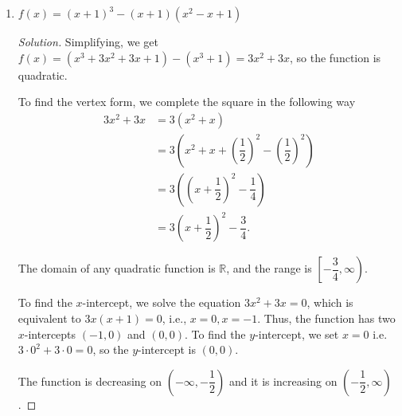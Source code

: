 \documentclass[12pt]{article}
\newenvironment{solution}{\begin{proof}[Solution]}{\end{proof}}
\begin{document}
\begin{enumerate}
\begin{enumerate}
\begin{solution}
				The function has a maximum at the point $\left(0,-\dfrac{9}{4}\right)$ and has no minimum.
				
			\end{solution}
			\item $f(x)=(x+1)^3-(x+1)(x^2-x+1)$
	
			\begin{solution}
				Simplifying, we get $f(x)=(x^3+3x^2+3x+1)-(x^3+1)=3x^2+3x$, so the function is quadratic.
				
				To find the vertex form, we complete the square in the following way
				\begin{align*}
					3x^2+3x&=3(x^2+x)\\
					&=3(x^2+x+\left(\dfrac{1}{2}\right)^2-\left(\dfrac{1}{2}\right)^2)\\
					&=3(\left(x+\dfrac{1}{2}\right)^2-\dfrac{1}{4})\\
					&=3\left(x+\dfrac{1}{2}\right)^2-\dfrac{3}{4}.
				\end{align*}
				
				The domain of any quadratic function is $\mathbb{R}$, and the range is $\left[-\dfrac{3}{4},\infty \right).$
				
				To find the $x$-intercept, we solve the equation $3x^2+3x=0$, which is equivalent to $3x(x+1)=0$, i.e., $x=0, x=-1$. Thus, the function has two $x$-intercepts $(-1,0)$ and $(0,0)$. To find the $y$-intercept, we set $x=0$ i.e. $3\cdot0^2+3\cdot 0=0$, so the $y$-intercept is $(0,0)$.
				
				The function is decreasing on $(-\infty,-\dfrac{1}{2})$ and it is increasing on $(-\dfrac{1}{2},\infty)$.
				

\end{solution}
\end{enumerate}
\end{enumerate}
\end{document}
